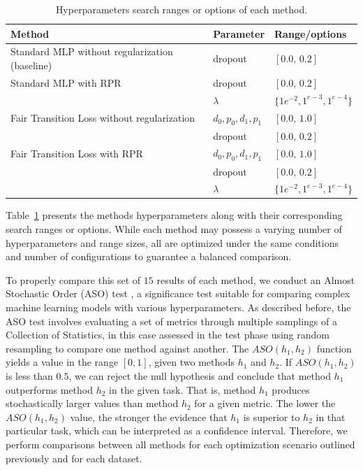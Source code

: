 \begin{table}[ht]
\centering
\caption{Hyperparameters search ranges or options of each method.}\label{tab:hyperparameters_rpr}
{\footnotesize
\begin{tabular}{lll}
\toprule
Method & Parameter & Range/options \\ \midrule
 Standard MLP without regularization (baseline) & dropout & $[0.0,\,0.2]$  \vspace{1ex} \\
 Standard MLP with RPR & dropout & $[0.0,\,0.2]$  \vspace{1ex} \\
 & $\lambda$ & $\{1e^{-2}, 1^{e-3}, 1^{e-4}\}$ \\
 Fair Transition Loss without regularization & $d_0,p_0,d_1,p_1$ & $[0.0,\,1.0]$ \\
 &  dropout & $[0.0,\,0.2]$ \\
 Fair Transition Loss with RPR & $d_0,p_0,d_1,p_1$ & $[0.0,\,1.0]$ \\
 &  dropout & $[0.0,\,0.2]$ \\
 & $\lambda$ & $\{1e^{-2}, 1^{e-3}, 1^{e-4}\}$ \\
\bottomrule
\end{tabular}
}
\end{table}

Table~\ref{tab:hyperparameters_rpr} presents the methods hyperparameters along with their corresponding search ranges or options. While each method may possess a varying number of hyperparameters and range sizes, all are optimized under the same conditions and number of configurations to guarantee a balanced comparison.

To properly compare this set of $15$ results of each method, we conduct an Almost Stochastic Order (ASO) test \citep{dror2019deep}, a significance test suitable for comparing complex machine learning models with various hyperparameters. As described before, the ASO test involves evaluating a set of metrics through multiple samplings of a Collection of Statistics, in this case assessed in the test phase using random resampling to compare one method against another. The $ASO(h_1, h_2)$ function yields a value in the range $[0, 1]$, given two methods $h_1$ and $h_2$. If $ASO(h_1, h_2)$ is less than $0.5$, we can reject the null hypothesis and conclude that method $h_1$ outperforms method $h_2$ in the given task. That is, method $h_1$ produces stochastically larger values than method $h_2$ for a given metric. The lower the $ASO(h_1, h_2)$ value, the stronger the evidence that $h_1$ is superior to $h_2$ in that particular task, which can be interpreted as a confidence interval. Therefore, we perform comparisons between all methods for each optimization scenario outlined previously and for each dataset.

